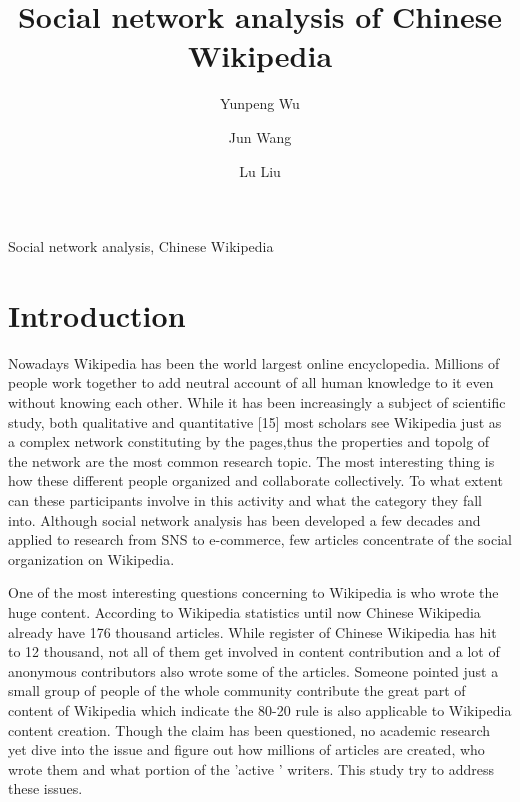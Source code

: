 \documentclass{elsarticle}
\begin{document}
\begin{frontmatter}
  \title{Social network analysis of Chinese Wikipedia }

  \author[buaa]{Yunpeng Wu}
  \author[buaa]{Jun Wang}
  \author[buaa]{Lu Liu}
  

  \address[buaa]{School of Economics \& Management, Beihang University, 
    Beijing 100083, P.R. China}
  
  \begin{abstract}
    
  \end{abstract}

  \begin{keyword}
    Social network analysis, Chinese Wikipedia
  \end{keyword}

\end{frontmatter}

\listoftodos
\section{Introduction}
\label{sec:introduction}
Nowadays Wikipedia has been the world largest online
encyclopedia. Millions of people work together to add neutral account
of all human knowledge  to it
even without knowing each other. While it has been increasingly a
subject of scientific study, both qualitative and quantitative [15]
most scholars see Wikipedia just as a complex network constituting by
the pages,thus the
properties and topolg of the network are the most common research
topic. The most interesting thing is how
these different people organized and collaborate collectively. To what extent can
these participants involve in this activity and what the category they
fall into. Although social network analysis has been developed a few
decades and applied to research from SNS to e-commerce, few articles
concentrate of the social organization on Wikipedia.

One of the most interesting questions concerning to Wikipedia is who
wrote the huge content. According to Wikipedia statistics until now
Chinese Wikipedia already have 176 thousand articles\cite{wikistat}.
While  register of Chinese Wikipedia has hit to  12
thousand, not all of them get involved in content contribution and
a lot of anonymous contributors also wrote some of the
articles. Someone pointed just a small group of people of the whole
community contribute the great part of content of Wikipedia which
indicate the 80-20 rule is also applicable to Wikipedia content
creation\cite{aswartz}. Though the claim has been questioned, no
academic research yet dive into the issue and figure out how millions
of articles are created, who wrote them and what portion of the
'active ' writers. This study try to address these issues.
\end{document}

